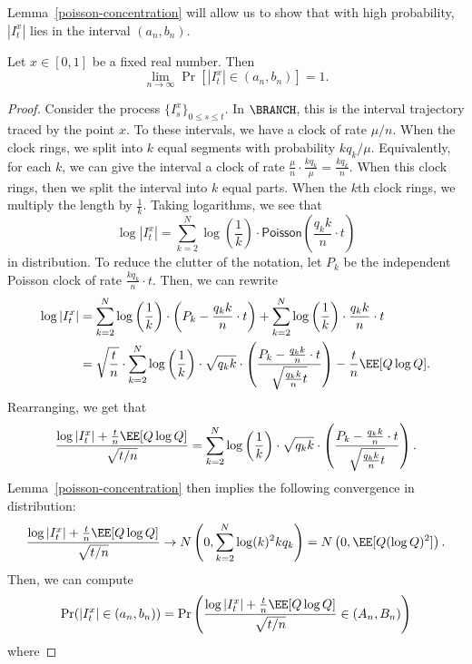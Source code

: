 \documentclass[12pt]{article}
\begin{document}
Lemma~\ref{poisson-concentration} will allow us to show that with high probability, $|I_t^x|$ lies in the interval $(a_n, b_n)$.

\begin{lem} \label{high-probability-YES}
	Let $x \in [0, 1]$ be a fixed real number. Then 
	\[
		\lim_{n \to \infty} \Pr [ |I_t^x| \in (a_n, b_n) ] = 1. 
	\]
\end{lem}

\begin{proof}
	Consider the process $\{I_s^x\}_{0 \leq s \leq t}$. In $\BRANCH$, this is the interval trajectory traced by the point $x$. To these intervals, we have a clock of rate $\mu / n$. When the clock rings, we split into $k$ equal segments with probability $kq_k / \mu$. Equivalently, for each $k$, we can give the interval a clock of rate $\frac{\mu}{n} \cdot \frac{kq_k}{\mu} = \frac{kq_k}{n}$. When this clock rings, then we split the interval into $k$ equal parts. When the $k$th clock rings, we multiply the length by $\frac{1}{k}$. Taking logarithms, we see that 
	\[
		\log |I_t^x| = \sum_{k = 2}^N \log \left ( \frac{1}{k} \right ) \cdot \mathsf{Poisson} \left ( \frac{q_k k}{n} \cdot t \right )
	\]
	in distribution. To reduce the clutter of the notation, let $P_k$ be the independent Poisson clock of rate $\frac{k q_k}{n} \cdot t$. Then, we can rewrite 
	\begin{align*}
	\log |I_t^x| & = \sum_{k = 2}^N \log \left ( \frac{1}{k} \right ) \cdot \left ( P_k - \frac{q_k k}{n} \cdot t \right ) + \sum_{k = 2}^N \log \left ( \frac{1}{k} \right ) \cdot \frac{q_k k}{n} \cdot t	\\
	& = \sqrt{\frac{t}{n}} \cdot \sum_{k = 2}^N \log \left ( \frac{1}{k} \right ) \cdot \sqrt{q_k k} \cdot \left ( \frac{P_k - \frac{q_k k}{n} \cdot t}{\sqrt{\frac{q_k k}{n} t}} \right ) - \frac{t}{n} \EE[Q \log Q].
\end{align*}
Rearranging, we get that 
\[
	\frac{\log |I_t^x| + \frac{t}{n} \EE[Q \log Q]}{\sqrt{t/n}} = \sum_{k = 2}^N \log \left ( \frac{1}{k} \right ) \cdot \sqrt{q_k k} \cdot	\left ( \frac{P_k - \frac{q_k k}{n} \cdot t}{\sqrt{\frac{q_k k}{n} t}} \right ).
\]
Lemma~\ref{poisson-concentration} then implies the following convergence in distribution:
\[
	\frac{\log |I_t^x| + \frac{t}{n} \EE[Q \log Q]}{\sqrt{t/n}} \to N \left (0, \sum_{k = 2}^N \log(k)^2 k q_k \right ) = N \left (0, \EE[Q (\log Q)^2] \right ).
\]
Then, we can compute 
\[
	\Pr (|I_t^x| \in (a_n, b_n)) = \Pr \left ( \frac{\log |I_t^x| + \frac{t}{n} \EE[Q \log Q]}{\sqrt{t/n}} \in (A_n, B_n) \right )
\]
where

\end{proof}
\end{document}
